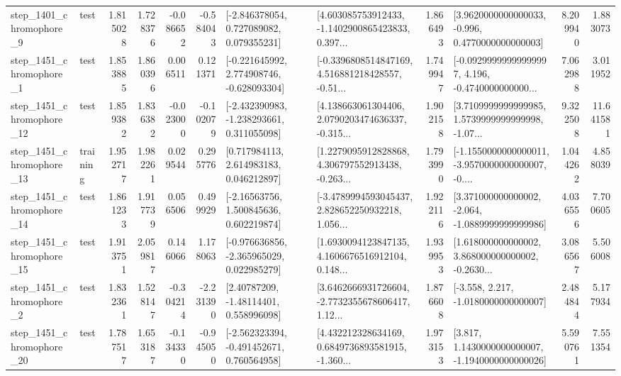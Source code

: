 \begin{tabular}{llrrrrllrlrr}
  step\_1401\_chromophore\_9 &      test &      1.815028 &    1.728376 &     -0.086652 & -0.584043 &    [-2.846378054, 0.727089082, 0.079355231] &  [4.603085753912433, -1.1402900865423833, 0.397... &       1.866493 &   [3.9620000000000033, -0.996, 0.4770000000000003] &            8.209940 &          1.883073 \\
  step\_1451\_chromophore\_1 &      test &      1.853885 &    1.860396 &      0.006511 &  0.121371 &   [-0.221645992, 2.774908746, -0.628093304] &  [-0.3396808514847169, 4.516881218428557, -0.51... &       1.749947 &  [-0.09299999999999997, 4.196, -0.4740000000000... &            7.062988 &          3.011952 \\
 step\_1451\_chromophore\_12 &      test &      1.859382 &    1.836382 &     -0.023000 & -0.102079 &   [-2.432390983, -1.238293661, 0.311055098] &  [4.138663061304406, 2.0790203474636337, -0.315... &       1.902158 &  [3.7109999999999985, 1.5739999999999998, -1.07... &            9.322508 &         11.641581 \\
 step\_1451\_chromophore\_13 &  training &      1.952717 &    1.982261 &      0.029544 &  0.295776 &     [0.717984113, 2.614983183, 0.046212897] &  [1.2279095912828868, 4.306797552913438, -0.263... &       1.793990 &  [-1.1550000000000011, -3.9570000000000007, -0.... &            1.044262 &          4.858039 \\
 step\_1451\_chromophore\_14 &      test &      1.861233 &    1.917739 &      0.056506 &  0.499929 &     [-2.16563756, 1.500845636, 0.602219874] &  [-3.4789994593045437, 2.828652250932218, 1.056... &       1.922116 &   [3.371000000000002, -2.064, -1.0889999999999986] &            4.036556 &          7.700605 \\
 step\_1451\_chromophore\_15 &      test &      1.913751 &    2.059817 &      0.146066 &  1.178063 &   [-0.976636856, -2.365965029, 0.022985279] &  [1.6930094123847135, 4.1606676516912104, 0.148... &       1.939953 &  [1.618000000000002, 3.868000000000002, -0.2630... &            3.086567 &          5.506008 \\
  step\_1451\_chromophore\_2 &      test &      1.832361 &    1.528147 &     -0.304214 & -2.231390 &      [2.40787209, -1.48114401, 0.558996098] &  [3.6462666931726604, -2.7732355678606417, 1.12... &       1.876608 &               [-3.558, 2.217, -1.0180000000000007] &            2.484844 &          5.177934 \\
 step\_1451\_chromophore\_20 &      test &      1.787517 &    1.653187 &     -0.134330 & -0.945050 &   [-2.562323394, -0.491452671, 0.760564958] &  [4.432212328634169, 0.6849736893581915, -1.360... &       1.973153 &   [3.817, 1.1430000000000007, -1.1940000000000026] &            5.590761 &          7.551354 \\

\end{tabular}
